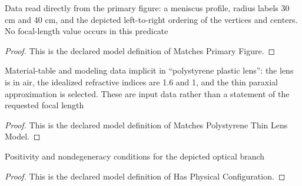 \begin{definition}
  \label{def:physics:phyx-mini-0067:phyxminiproblems-problemphyxmini0067-matchesprimaryfigure}
  Data read directly from the primary figure: a meniscus profile, radius labels 30 cm and 40 cm, and the depicted left-to-right ordering of the vertices and centers. No focal-length value occurs in this predicate
\end{definition}
\begin{proof}
  This is the declared model definition of Matches Primary Figure.
\end{proof}
\begin{definition}
  \label{def:physics:phyx-mini-0067:phyxminiproblems-problemphyxmini0067-matchespolystyrenethinlensmodel}
  Material-table and modeling data implicit in “polystyrene plastic lens”: the lens is in air, the idealized refractive indices are 1.6 and 1, and the thin paraxial approximation is selected. These are input data rather than a statement of the requested focal length
\end{definition}
\begin{proof}
  This is the declared model definition of Matches Polystyrene Thin Lens Model.
\end{proof}
\begin{definition}
  \label{def:physics:phyx-mini-0067:phyxminiproblems-problemphyxmini0067-hasphysicalconfiguration}
  Positivity and nondegeneracy conditions for the depicted optical branch
\end{definition}
\begin{proof}
  This is the declared model definition of Has Physical Configuration.
\end{proof}
